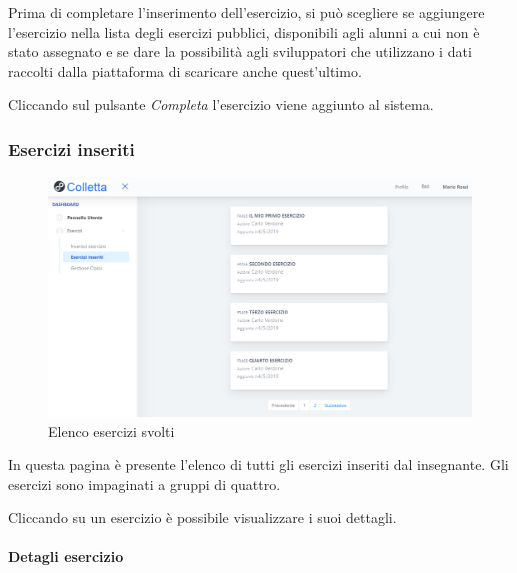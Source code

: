           Prima di completare l'inserimento dell'esercizio, si può scegliere se aggiungere l'esercizio nella lista degli esercizi pubblici, disponibili agli alunni a cui non è stato assegnato e se dare la possibilità agli sviluppatori che utilizzano i dati raccolti dalla piattaforma di scaricare anche quest'ultimo. 
          
            Cliccando sul pulsante \textit{Completa} l'esercizio viene aggiunto al sistema.
          
\subsubsection{Esercizi inseriti}
\begin{figure}[H]
            	\centering
        		\includegraphics[width=17cm]{sez/img/insegnante/eserinseriti.PNG} 
            	\caption{Elenco esercizi svolti}\label{fig:1}
        	\end{figure}  
        	In questa pagina è presente l'elenco di tutti gli esercizi inseriti dal insegnante. Gli esercizi sono impaginati a gruppi di quattro.
        	
        	 Cliccando su un esercizio è possibile visualizzare i suoi dettagli.               
\newpage
\paragraph{Detagli esercizio}\mbox{}\\   

